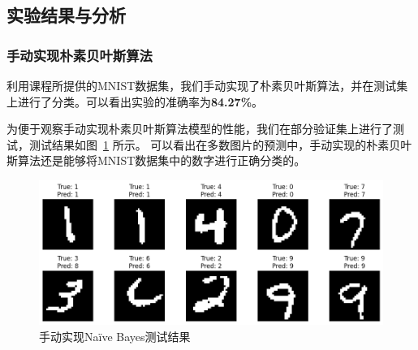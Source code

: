 \documentclass[12pt]{article}
\begin{document}
\subsection{实验结果与分析}
\subsubsection{手动实现朴素贝叶斯算法}
利用课程所提供的MNIST数据集，我们手动实现了朴素贝叶斯算法，并在测试集上进行了分类。可以看出实验的准确率为\textbf{84.27\%}。

为便于观察手动实现朴素贝叶斯算法模型的性能，我们在部分验证集上进行了测试，测试结果如图~\ref{fig:手动实现Na\"ive Bayes测试结果} 所示。
可以看出在多数图片的预测中，手动实现的朴素贝叶斯算法还是能够将MNIST数据集中的数字进行正确分类的。

\begin{figure}[htbp]
  \centering
  \includegraphics[scale=0.6]{figures/naive/manual_8427.png}
  \caption{手动实现Na\"ive Bayes测试结果}
  \label{fig:手动实现Na\"ive Bayes测试结果}
\end{figure}



\end{document}
